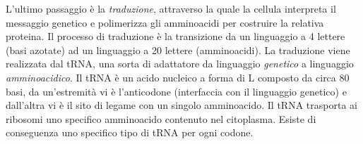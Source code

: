 \par L'ultimo passaggio è la \textit{traduzione}, attraverso la quale la cellula interpreta il messaggio genetico e polimerizza gli amminoacidi per costruire la relativa proteina. Il processo di traduzione è la transizione da un linguaggio a 4 lettere (basi azotate) ad un linguaggio a 20 lettere (amminoacidi). La traduzione viene realizzata dal tRNA, una sorta di adattatore da linguaggio \textit{genetico }a linguaggio \textit{amminoacidico}. Il tRNA è un acido nucleico a forma di L composto da circa 80 basi, da un'estremità vi è l'anticodone (interfaccia con il linguaggio genetico) e dall'altra vi è il sito di legame con un singolo amminoacido. Il tRNA trasporta ai ribosomi uno specifico amminoacido contenuto nel citoplasma. Esiste di conseguenza uno specifico tipo di tRNA per ogni codone.

